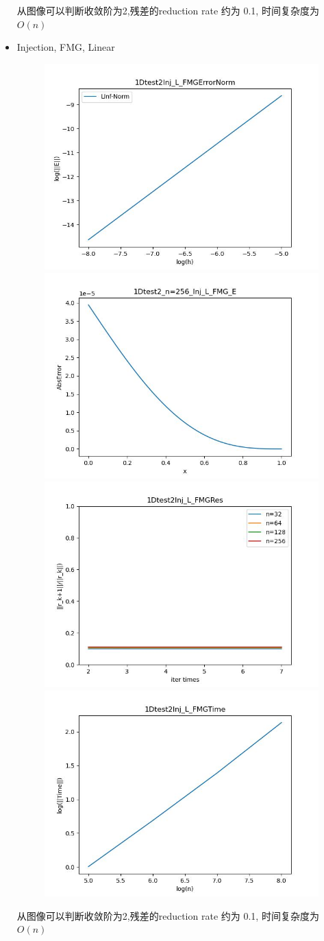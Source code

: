 \documentclass{article}
\begin{document}
\begin{itemize}
    从图像可以判断收敛阶为2,残差的reduction rate 约为 0.1, 时间复杂度为$O(n)$
    \newpage
    \item Injection, FMG, Linear
    \begin{figure}[h]
        \centering
        \includegraphics[width=0.35\linewidth]{1Dtest2Inj_L_FMGErrorNorm.jpg}
        \includegraphics[width=0.35\linewidth]{1Dtest2_n=256_Inj_L_FMG_E.jpg}
        \includegraphics[width=0.35\linewidth]{1Dtest2Inj_L_FMGRes.jpg}
        \includegraphics[width=0.35\linewidth]{1Dtest2Inj_L_FMGTime.jpg}
    \end{figure}
    
    从图像可以判断收敛阶为2,残差的reduction rate 约为 0.1, 时间复杂度为$O(n)$


\end{itemize}
\end{document}
